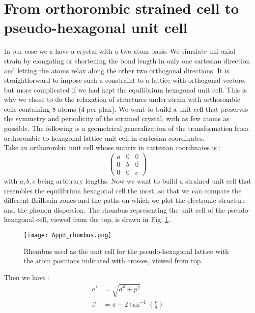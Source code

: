 \section{From orthorombic strained cell to pseudo-hexagonal unit cell} \label{app:ortho2hex}
In our case we a have a crystal with a two-atom basis. We simulate uni-axial strain by elongating or shortening the bond length in only one cartesian direction and letting the atoms relax along the other two orthogonal directions.
It is straightforward to impose such a constraint to a lattice with orthogonal vectors, but more complicated if we had kept the equilibrium hexagonal unit cell. This is why we chose to do the relaxation of structures under strain with orthorombic cells containing 8 atoms (4 per plan).
We want to build a unit cell that preserves the symmetry and periodicity of the strained crystal, with as few atoms as possible. The following is a geometrical generalization of the transformation from orthorombic to hexagonal lattice unit cell in cartesian coordinates.\\
Take an orthorombic unit cell whose matrix in cartesian coordinates is :
\begin{equation}
\begin{pmatrix}
a & 0 & 0\\
0 & b & 0\\
0 & 0 & c
\end{pmatrix}
\end{equation}
with $a,b,c$ being arbitrary lengths.
Now we want to build a strained unit cell that resembles the equilibrium hexagonal cell the most, so that we can compare the different Brillouin zones and the paths on which we plot the electronic structure and the phonon dispersion. The rhombus representing the unit cell of the pseudo-hexagonal cell, viewed from the top, is drawn in Fig. \ref{fig:rhomb}.
\begin{figure}[b]
    \centering
    \texttt{[image: AppB\_rhombus.png]}
    \caption{Rhombus used as the unit cell for the pseudo-hexagonal lattice with the atom positions indicated with crosses, viewed from top.}
    \label{fig:rhomb}
\end{figure}
Then we have :
\begin{align}
    a' & = \sqrt{d^2 + p^2} \\
    \beta &= \pi - 2 \tan ^{-1} \left(\frac{p}{d}\right)
\end{align}

